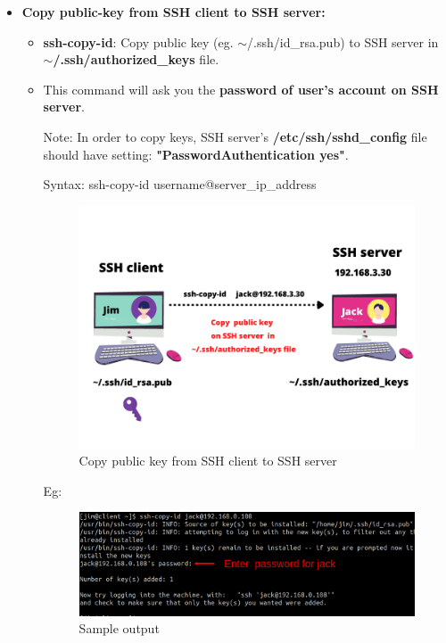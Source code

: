 \begin{flushleft}
\begin{itemize}
		
	\newpage
	
	\item \textbf{Copy public-key from SSH client to SSH server:}
	\begin{itemize}
		\item \textbf{ssh-copy-id}: Copy public key (eg. $\sim$/.ssh/id\_rsa.pub) to SSH server in \textbf{$\sim$/.ssh/authorized\_keys} file.
		\item This command will ask you the \textbf{password of user's account on SSH server}.
		\bigskip
		\begin{tcolorbox}[breakable,notitle,boxrule=-0pt,colback=yellow,colframe=yellow]
			\color{black}
			Note: In order to copy keys, SSH server's \textbf{/etc/ssh/sshd\_config}  file should have setting:  \textbf{"PasswordAuthentication yes"}. 
		\end{tcolorbox}
		
		\bigskip
		\begin{tcolorbox}[breakable,notitle,boxrule=0pt,colback=pink,colframe=pink]
			\color{black}
			\font=9pt
			Syntax: ssh-copy-id  username@server\_ip\_address
			\font=4pt
		\end{tcolorbox}
		
		\begin{figure}[h!]
			\centering
			\includegraphics[scale=0.4]{content/chapter19/images/ssh01.png}
			\caption{Copy public key from SSH client to SSH server}
			\label{fig:stage556}
		\end{figure}
			
		Eg:
		\begin{figure}[h!]
			\centering
			\includegraphics[scale=0.2]{content/chapter19/images/ssh09.png}
			\caption{Sample output}
			\label{fig:stage5569}
		\end{figure}


\end{itemize}
\end{itemize}
\end{flushleft}
